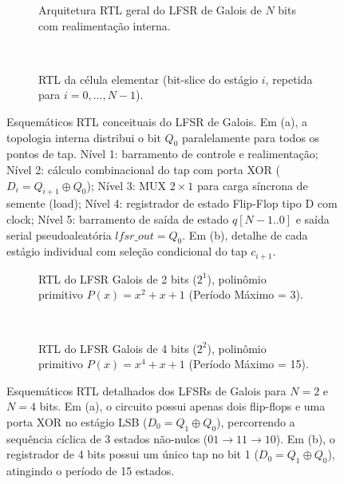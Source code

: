 \documentclass{article}
\begin{document}
\begin{figure}[p]
  \centering
  \begin{subfigure}{\linewidth}\centering
    \resizebox{0.74\linewidth}{!}{}
    \caption{Arquitetura RTL geral do LFSR de Galois de $N$ bits com realimentação interna.}
  \end{subfigure}\\[2mm]
  \begin{subfigure}{\linewidth}\centering
    \resizebox{0.68\linewidth}{!}{}
    \caption{RTL da célula elementar (bit-slice do estágio $i$, repetida para $i = 0, \dots, N-1$).}
  \end{subfigure}
  \caption{Esquemáticos RTL conceituais do LFSR de Galois.
    Em (a), a topologia interna distribui o bit $Q_0$ paralelamente para todos os pontos de tap.
    Nível 1: barramento de controle e realimentação;
    Nível 2: cálculo combinacional do tap com porta XOR ($D_i = Q_{i+1} \oplus Q_0$);
    Nível 3: MUX $2\times1$ para carga síncrona de semente (load);
    Nível 4: registrador de estado Flip-Flop tipo D com clock;
    Nível 5: barramento de saída de estado $q[N{-}1..0]$ e saída serial pseudoaleatória $lfsr\_out = Q_0$.
    Em (b), detalhe de cada estágio individual com seleção condicional do tap $c_{i+1}$.}
  \label{fig:rtl_galois_conceitual}
\end{figure}

\begin{figure}[p]
  \centering
  \begin{subfigure}{\linewidth}\centering
    \resizebox{0.78\linewidth}{!}{}
    \caption{RTL do LFSR Galois de 2 bits ($2^1$), polinômio primitivo $P(x) = x^2 + x + 1$ (Período Máximo = 3).}
  \end{subfigure}\\[2mm]
  \begin{subfigure}{\linewidth}\centering
    \resizebox{0.78\linewidth}{!}{}
    \caption{RTL do LFSR Galois de 4 bits ($2^2$), polinômio primitivo $P(x) = x^4 + x + 1$ (Período Máximo = 15).}
  \end{subfigure}
  \caption{Esquemáticos RTL detalhados dos LFSRs de Galois para $N = 2$ e $N = 4$ bits.
    Em (a), o circuito possui apenas dois flip-flops e uma porta XOR no estágio LSB ($D_0 = Q_1 \oplus Q_0$),
    percorrendo a sequência cíclica de 3 estados não-nulos ($01 \to 11 \to 10$).
    Em (b), o registrador de 4 bits possui um único tap no bit 1 ($D_0 = Q_1 \oplus Q_0$),
    atingindo o período de 15 estados.}
  \label{fig:rtl_galois_2_4}
\end{figure}
\end{document}

